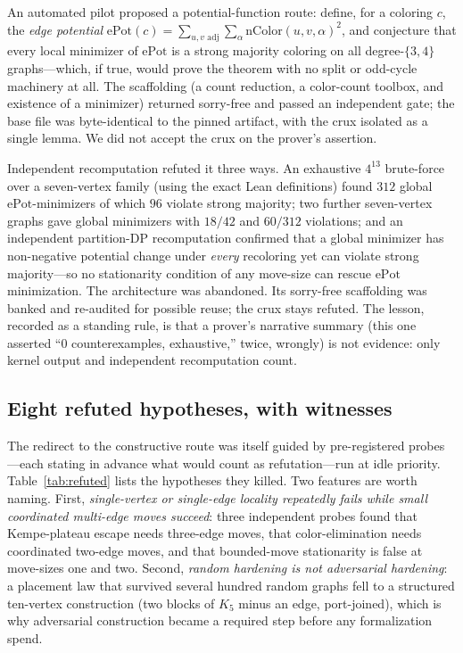 \documentclass[11pt]{article}
\theoremstyle{definition}
\theoremstyle{remark}
\begin{document}
An automated pilot proposed a potential-function route: define, for a coloring $c$, the \emph{edge potential} $\mathrm{ePot}(c) = \sum_{u,v\text{ adj}} \sum_\alpha \mathrm{nColor}(u,v,\alpha)^2$, and conjecture that every local minimizer of $\mathrm{ePot}$ is a strong majority coloring on all degree-$\{3,4\}$ graphs---which, if true, would prove the theorem with no split or odd-cycle machinery at all. The scaffolding (a count reduction, a color-count toolbox, and existence of a minimizer) returned sorry-free and passed an independent gate; the base file was byte-identical to the pinned artifact, with the crux isolated as a single lemma. We did not accept the crux on the prover's assertion.

Independent recomputation refuted it three ways. An exhaustive $4^{13}$ brute-force over a seven-vertex family (using the exact Lean definitions) found $312$ global $\mathrm{ePot}$-minimizers of which $96$ violate strong majority; two further seven-vertex graphs gave global minimizers with $18/42$ and $60/312$ violations; and an independent partition-DP recomputation confirmed that a global minimizer has non-negative potential change under \emph{every} recoloring yet can violate strong majority---so no stationarity condition of any move-size can rescue $\mathrm{ePot}$ minimization. The architecture was abandoned. Its sorry-free scaffolding was banked and re-audited for possible reuse; the crux stays refuted. The lesson, recorded as a standing rule, is that a prover's narrative summary (this one asserted ``0 counterexamples, exhaustive,'' twice, wrongly) is not evidence: only kernel output and independent recomputation count.

\subsection{Eight refuted hypotheses, with witnesses}\label{42-refuted}

The redirect to the constructive route was itself guided by pre-registered probes---each stating in advance what would count as refutation---run at idle priority. Table~\ref{tab:refuted} lists the hypotheses they killed. Two features are worth naming. First, \emph{single-vertex or single-edge locality repeatedly fails while small coordinated multi-edge moves succeed}: three independent probes found that Kempe-plateau escape needs three-edge moves, that color-elimination needs coordinated two-edge moves, and that bounded-move stationarity is false at move-sizes one and two. Second, \emph{random hardening is not adversarial hardening}: a placement law that survived several hundred random graphs fell to a structured ten-vertex construction (two blocks of $K_5$ minus an edge, port-joined), which is why adversarial construction became a required step before any formalization spend.
\end{document}

